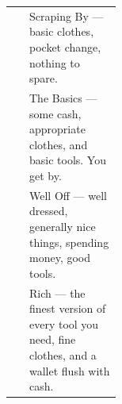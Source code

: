 \begin{statblock}
\begin{tabularx}{\linewidth}{@{}p{0.16\linewidth} Y@{}}
 & Scraping By --- basic clothes, pocket change, nothing to spare.\\[3pt]
 & The Basics --- some cash, appropriate clothes, and basic tools. You get by.\\[3pt]
 & Well Off --- well dressed, generally nice things, spending money, good tools.\\[3pt]
 & Rich --- the finest version of every tool you need, fine clothes, and a wallet flush with cash.\\
\end{tabularx}
\end{statblock}

